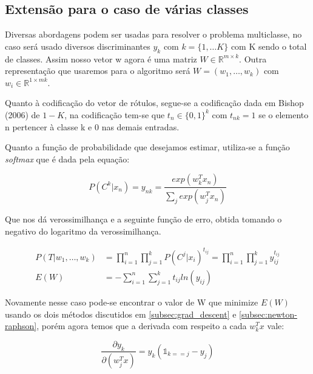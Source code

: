 \subsection{Extensão para o caso de várias classes}

Diversas abordagens podem ser usadas para resolver o problema multiclasse, no
caso será usado diversos discriminantes $y_k$ com $k = \{1, \ldots K\}$ com K
sendo o total de classes. Assim nosso vetor w agora é uma matriz
$W \in \mathbb{R}^{m \times k}$. Outra representação que usaremos para o algoritmo
será $W = (w_1, \ldots, w_k)$ com $w_i \in \mathbb{R}^{1 \times mk}$.

Quanto à codificação do vetor de rótulos, 
segue-se a codificação dada em Bishop (2006)\cite{bishop2006} de $1-K$,
na codificação tem-se que $t_n \in \{0, 1\}^k$ com $t_{nk} = 1$ se o elemento
n pertencer à classe k e 0 nas demais entradas. 

Quanto a função de probabilidade que desejamos estimar, utiliza-se a função
\textit{softmax} que é dada pela equação:

\begin{center}
	\begin{equation}
		P(C^k | x_n) = y_{nk} = \frac{exp(w_k^Tx_n)}{\sum_j exp(w_j^Tx_n)} 
	\end{equation}
\end{center}

Que nos dá verossimilhança e a seguinte função de erro, obtida
tomando o negativo do logaritmo da verossimilhança.

\begin{center}
	\begin{align*}
				P(T | w_1, \ldots, w_k) &= \prod_{i = 1}^{n} \prod_{j = 1}^{k} P(C^j | x_i)^{t_{ij}} = \prod_{i = 1}^{n} \prod_{j = 1}^{k} y_{ij}^{t_{ij}} \\
		E(W) &= - \sum_{i = 1}^{n} \sum_{j = 1}^{k} t_{ij} ln(y_{ij})	
	\end{align*}
\end{center}

Novamente nesse caso pode-se encontrar o valor de W que minimize $E(W)$ usando os
dois métodos discutidos em \ref{subsec:grad_descent} e \ref{subsec:newton-raphson},
porém agora temos que a derivada com respeito a cada $w_k^Tx$ vale:

\begin{center}
	\begin{equation}\label{eq:softmax_derivative}
		\frac{\partial y_k}{\partial (w_j^Tx)} = y_k(\mathds{1}_{k == j} - y_j)
	\end{equation}
\end{center}

